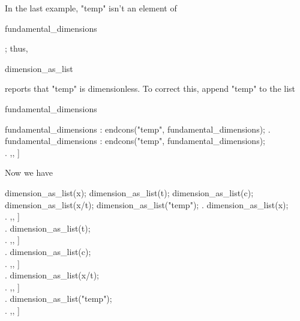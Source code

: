 \noindent In the last example, "temp" isn't an element of
\begin{verb} fundamental_dimensions \end{verb}; thus,  
\begin{verb} dimension_as_list \end{verb} 
reports that "temp" is dimensionless. To correct this, append "temp" to the list 
\begin{verb} fundamental_dimensions \end{verb}


\beginmaximasession
fundamental_dimensions : endcons("temp", fundamental_dimensions);
\maximatexsession
{}.  fundamental_dimensions : endcons("temp", fundamental_dimensions); \\
.  \left[ \mathrm{mass},\linebreak[0],\linebreak[0],\linebreak[0] \right] \\
\endmaximasession


\noindent Now we have

\beginmaximasession
dimension_as_list(x);
dimension_as_list(t);
dimension_as_list(c);
dimension_as_list(x/t);
dimension_as_list("temp");
\maximatexsession
{}.  dimension_as_list(x); \\
.  \left[ 0,\linebreak[0]1,, \right] \\
.  dimension_as_list(t); \\
.  \left[ 0,\linebreak[0]0,, \right] \\
.  dimension_as_list(c); \\
.  \left[ 0,\linebreak[0]1,, \right] \\
.  dimension_as_list(x/t); \\
.  \left[ 0,\linebreak[0]1,, \right] \\
.  dimension_as_list("temp"); \\
.  \left[ 0,\linebreak[0]0,, \right] \\
\endmaximasession

